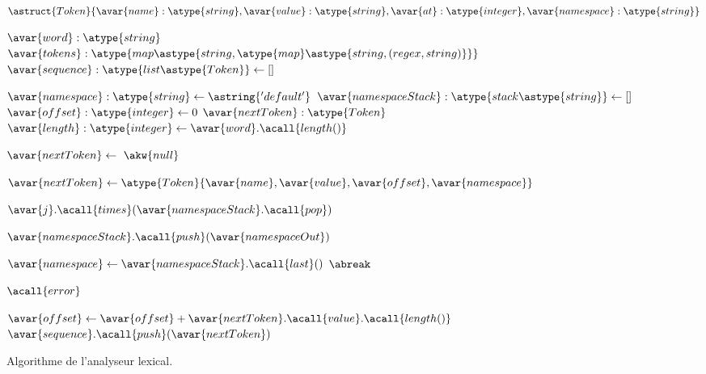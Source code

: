 \begin{figure}

\begin{algorithmic}[1]

\State $\astruct{Token}\{
    \avar{name}: \atype{string},
    \avar{value}: \atype{string},
    \avar{at}: \atype{integer},
    \avar{namespace}: \atype{string}
\}$


  \Require $\avar{word}: \atype{string}$
  \Require $\avar{tokens}: \atype{map\astype{string, \atype{map}\astype{string, (regex, string)}}}$
  \Ensure  $\avar{sequence}: \atype{list\astype{Token}} \gets []$

  \State $\avar{namespace}: \atype{string} \gets \astring{'default'}$
  \State $\avar{namespaceStack}: \atype{stack\astype{string}} \gets []$
  \State $\avar{offset}: \atype{integer} \gets 0$
  \State $\avar{nextToken}: \atype{Token}$
  \State $\avar{length}: \atype{integer} \gets \avar{word}.\acall{length()}$


      \State $\avar{nextToken} \gets~\akw{null}$



              \State $\avar{nextToken} \gets \atype{Token}\{\avar{name}, \avar{value}, \avar{offset}, \avar{namespace}\}$


                  \State $\avar{j}.\acall{times}(\avar{namespaceStack}.\acall{pop})$

              \Else

                  \State $\avar{namespaceStack}.\acall{push}(\avar{namespaceOut})$

              \EndIf

              \State $\avar{namespace} \gets \avar{namespaceStack}.\acall{last}()$
              \State $\abreak$

          \EndIf

      \EndFor


        \State $\acall{error}$

      \EndIf

      \State $\avar{offset} \gets \avar{offset} + \avar{nextToken}.\acall{value}.\acall{length()}$
      \State $\avar{sequence}.\acall{push}(\avar{nextToken})$

  \EndWhile

\EndFunction

\end{algorithmic}

\caption{\label{figure:data:algo_lexer} Algorithme de l'analyseur lexical.}

\end{figure}

